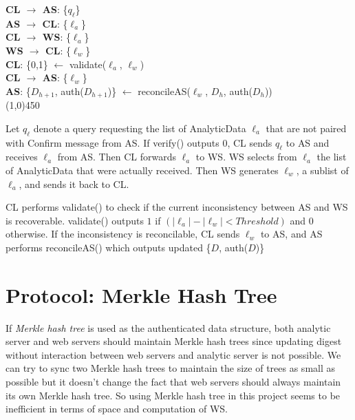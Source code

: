 \begin{framed}
\noindent
\textbf{CL $\rightarrow$ AS}: \textsf{\{$q_{\ell}$\}}		\\
\textbf{AS $\rightarrow$ CL}: \textsf{\{$\ell_a$\}}		\\

\noindent
\textbf{CL $\rightarrow$ WS}: \textsf{\{$\ell_a$\}}		\\
\textbf{WS $\rightarrow$ CL}: \textsf{\{$\ell_w$\}}		\\

\noindent
\textbf{CL}: \textsf{\{0,1\}} $\leftarrow$ \textsf{validate($\ell_a$, $\ell_w$)}		\\

\noindent
\textbf{CL $\rightarrow$ AS}: \textsf{\{$\ell_w$\}}		\\
\textbf{AS}: \textsf{\{$D_{h+1}$, auth($D_{h+1}$)\} $\leftarrow$ reconcileAS($\ell_w$, $D_h$, auth($D_h$))}	\\
\line(1,0){450}

\noindent
Let $q_\ell$ denote a query requesting the list of \textsf{AnalyticData} $\ell_a$ that are not paired with \textsf{Confirm} message from \textsf{AS}.
If \textsf{verify()} outputs $0$, \textsf{CL} sends $q_\ell$ to \textsf{AS} and receives $\ell_a$ from \textsf{AS}.
Then \textsf{CL} forwards $\ell_a$ to \textsf{WS}.
\textsf{WS} selects from $\ell_a$ the list of \textsf{AnalyticData} that were actually received.
Then \textsf{WS} generates $\ell_w$, a sublist of \textsf{$\ell_a$}, and sends it back to \textsf{CL}.

\noindent
\textsf{CL} performs \textsf{validate()} to check if the current inconsistency between \textsf{AS} and \textsf{WS} is recoverable. 
\textsf{validate()} outputs $1$ if $(|\ell_a| - |\ell_w| < Threshold )$ and $0$ otherwise.  
If the inconsistency is reconcilable, \textsf{CL} sends $\ell_w$ to \textsf{AS}, and \textsf{AS} performs \textsf{reconcileAS()} which outputs updated \textsf{\{$D$, auth($D$)\}}

\end{framed}



\section{Protocol: Merkle Hash Tree}

If \emph{Merkle hash tree} is used as the authenticated data structure, both analytic server and web servers should maintain Merkle hash trees since updating digest without interaction between web servers and analytic server is not possible. 
We can try to sync two Merkle hash trees to maintain the size of trees as small as possible but it doesn't change the fact that web servers should always maintain its own Merkle hash tree. 
So using Merkle hash tree in this project seems to be inefficient in terms of space and computation of \textsf{WS}.

